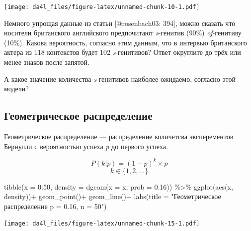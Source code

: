 \documentclass[
]{book}
\makeatletter
\newenvironment{Shaded}{\begin{snugshade}}{\end{snugshade}}
\newcommand{\AttributeTok}[1]{\textcolor[rgb]{0.77,0.63,0.00}{#1}}
\newcommand{\DecValTok}[1]{\textcolor[rgb]{0.00,0.00,0.81}{#1}}
\newcommand{\FloatTok}[1]{\textcolor[rgb]{0.00,0.00,0.81}{#1}}
\newcommand{\FunctionTok}[1]{\textcolor[rgb]{0.00,0.00,0.00}{#1}}
\newcommand{\NormalTok}[1]{#1}
\newcommand{\SpecialCharTok}[1]{\textcolor[rgb]{0.00,0.00,0.00}{#1}}
\newcommand{\StringTok}[1]{\textcolor[rgb]{0.31,0.60,0.02}{#1}}
\newenvironment{kframe}{%
    \medskip{}
    \setlength{\fboxsep}{.8em}
    \def\at@end@of@kframe{}%
    \ifinner\ifhmode%
    \def\at@end@of@kframe{\end{minipage}}%
    \begin{minipage}{\columnwidth}%
    \fi\fi%
    \def\FrameCommand##1{\hskip\@totalleftmargin \hskip-\fboxsep
    \colorbox{shadecolor}{##1}\hskip-\fboxsep
        \hskip-\linewidth \hskip-\@totalleftmargin \hskip\columnwidth}%
    \MakeFramed {\advance\hsize-\width
      \@totalleftmargin\z@ \linewidth\hsize
      \@setminipage}}%
  {\par\unskip\endMakeFramed%
    \at@end@of@kframe}
\newenvironment{rmdblock}[1]
  {
    \begin{itemize}
    \renewcommand{\labelitemi}{
      \raisebox{-.7\height}[0pt][0pt]{
        {\setkeys{Gin}{width=3em,keepaspectratio}\texttt{[image: images/\#1]}}
        }
        }
        \setlength{\fboxsep}{1em}
        \begin{kframe}
        \item
      }
      {
        \end{kframe}
        \end{itemize}
      }
\newenvironment{rmdtask}
      {\begin{rmdblock}{task}}
      {\end{rmdblock}}
\makeatother
\begin{document}
\texttt{[image: da4l\_files/figure-latex/unnamed-chunk-10-1.pdf]}

\begin{rmdtask}
Немного упрощая данные из статьи {[}@rosenbach03: 394{]}, можно сказать
что носители британского английского предпочитают \emph{s}-генитив
(90\%) \emph{of}-генитиву (10\%). Какова вероятность, согласно этим
данным, что в интервью британского актера из 118 контекстов будет 102
\emph{s}-генитивов? Ответ округлите до трёх или менее знаков после
запятой.
\end{rmdtask}

\begin{rmdtask}
А какое значение количества \emph{s}-генитивов наиболее ожидаемо,
согласно этой модели?
\end{rmdtask}

\hypertarget{ux433ux435ux43eux43cux435ux442ux440ux438ux447ux435ux441ux43aux43eux435-ux440ux430ux441ux43fux440ux435ux434ux435ux43bux435ux43dux438ux435}{%
\subsection{Геометрическое распределение}\label{ux433ux435ux43eux43cux435ux442ux440ux438ux447ux435ux441ux43aux43eux435-ux440ux430ux441ux43fux440ux435ux434ux435ux43bux435ux43dux438ux435}}

Геометрическое распределение --- распределение количетсва эксперементов Бернулли с вероятностью успеха \emph{p} до первого успеха.

\[P(k | p) = (1-p)^k\times p\]
\[k\in\{1, 2, \dots\}\]

\begin{Shaded}
\begin{Highlighting}[]
\FunctionTok{tibble}\NormalTok{(}\AttributeTok{x =} \DecValTok{0}\SpecialCharTok{:}\DecValTok{50}\NormalTok{,}
       \AttributeTok{density =} \FunctionTok{dgeom}\NormalTok{(}\AttributeTok{x =}\NormalTok{ x, }\AttributeTok{prob =} \FloatTok{0.16}\NormalTok{)) }\SpecialCharTok{\%\textgreater{}\%} 
  \FunctionTok{ggplot}\NormalTok{(}\FunctionTok{aes}\NormalTok{(x, density))}\SpecialCharTok{+}
  \FunctionTok{geom\_point}\NormalTok{()}\SpecialCharTok{+}
  \FunctionTok{geom\_line}\NormalTok{()}\SpecialCharTok{+}
  \FunctionTok{labs}\NormalTok{(}\AttributeTok{title =} \StringTok{"Геометрическое распределение p = 0.16, n = 50"}\NormalTok{)}
\end{Highlighting}
\end{Shaded}

\texttt{[image: da4l\_files/figure-latex/unnamed-chunk-15-1.pdf]}
\end{document}
